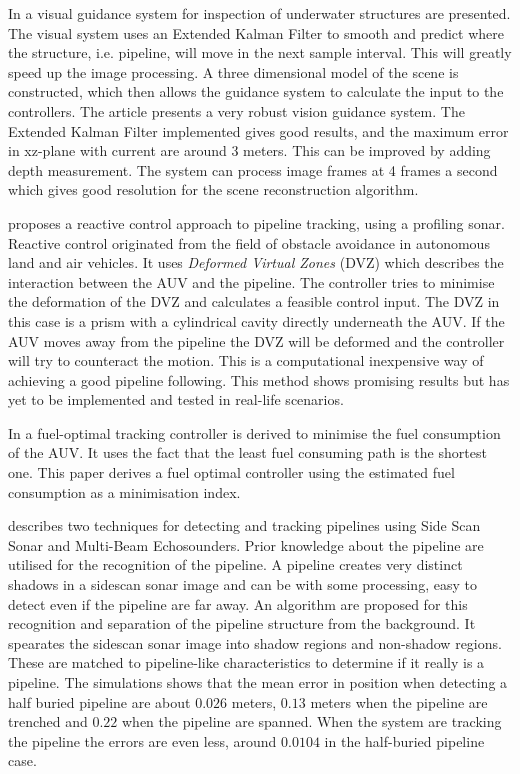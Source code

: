	In \cite{Visual_inpsection_of_seabottom_by_AUV} a visual guidance system for inspection of underwater
	structures are presented. The visual system uses an Extended Kalman Filter to smooth and predict where 
	the structure, i.e. pipeline, will move in the next sample interval. This will greatly speed up the image
	processing. 
	A three dimensional model of the scene is constructed, which then allows the guidance system to calculate 
	the input to the controllers. The article presents a very robust vision guidance system. The Extended
	Kalman Filter implemented gives good results, and the maximum error in xz-plane with current are
	around 3 meters. This can be improved by adding depth measurement. The system can process image frames at 4
	frames a second which gives good resolution for the scene reconstruction algorithm. 
	
	\cite{reactive_control_AUV} proposes a reactive control approach to pipeline tracking, using a 
	profiling sonar. Reactive control originated from the field of obstacle avoidance in autonomous land and air 
	vehicles. It uses \textit{Deformed Virtual Zones} (DVZ) which describes the interaction between the AUV and 
	the pipeline. The controller tries to minimise the deformation of the DVZ and calculates a feasible
	control input. The DVZ in this case is a prism with a cylindrical cavity directly underneath the AUV. If the AUV
	moves away from the pipeline the DVZ will be deformed and the controller will try to counteract the 
	motion. This is a computational inexpensive way of achieving a good pipeline following. This 
	method shows promising results but has yet to be implemented and tested in real-life scenarios. 
	
	In \cite{fuel_optimal_control} a fuel-optimal tracking controller is derived to minimise the fuel
	consumption of the AUV. It uses the fact that the least fuel consuming path is the shortest one. This
	paper derives a fuel optimal controller using the estimated fuel consumption as a minimisation index. 

	\cite{side_scan_sonar} describes two techniques for detecting and tracking pipelines using Side Scan
	Sonar and Multi-Beam Echosounders. Prior knowledge about the pipeline are utilised for the recognition
	of the pipeline. A pipeline creates very distinct shadows in a sidescan sonar image and can be with
	some processing, easy to detect even if the pipeline are far away. An algorithm are proposed for this
	recognition and separation of the pipeline structure from the background. It spearates the
	sidescan sonar image into
	shadow regions and non-shadow regions. These are matched to pipeline-like characteristics to determine
	if it really is a pipeline. The simulations shows that the mean error in position when detecting a half 
	buried pipeline are about $0.026$ meters, $0.13$ meters when the pipeline are trenched and $0.22$
	when the pipeline are spanned. When the system are tracking the pipeline the errors are even less,
	around $0.0104$ in the half-buried pipeline case.
	



